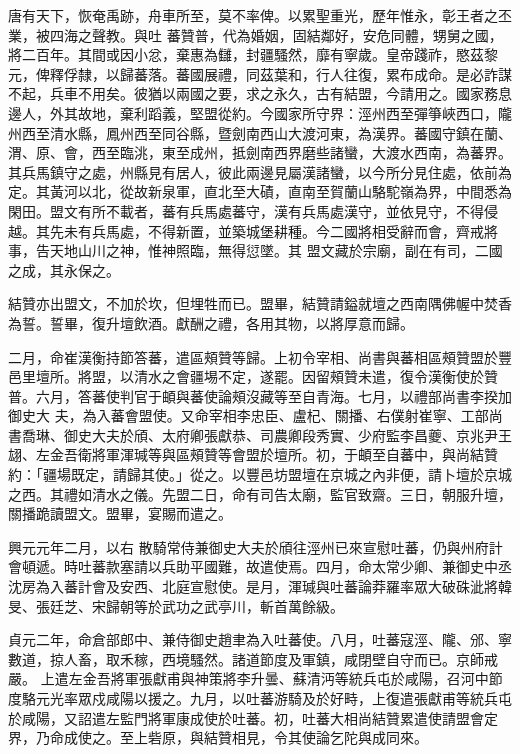 \begin{pinyinscope}
 唐有天下，恢奄禹跡，舟車所至，莫不率俾。以累聖重光，歷年惟永，彰王者之丕業，被四海之聲教。與吐
 蕃贊普，代為婚姻，固結鄰好，安危同體，甥舅之國，將二百年。其間或因小忿，棄惠為讎，封疆騷然，靡有寧歲。皇帝踐祚，愍茲黎元，俾釋俘隸，以歸蕃落。蕃國展禮，同茲葉和，行人往復，累布成命。是必詐謀不起，兵車不用矣。彼猶以兩國之要，求之永久，古有結盟，今請用之。國家務息邊人，外其故地，棄利蹈義，堅盟從約。今國家所守界：涇州西至彈箏峽西口，隴州西至清水縣，鳳州西至同谷縣，暨劍南西山大渡河東，為漢界。蕃國守鎮在蘭、
 渭、原、會，西至臨洮，東至成州，抵劍南西界磨些諸蠻，大渡水西南，為蕃界。其兵馬鎮守之處，州縣見有居人，彼此兩邊見屬漢諸蠻，以今所分見住處，依前為定。其黃河以北，從故新泉軍，直北至大磧，直南至賀蘭山駱駝嶺為界，中間悉為閑田。盟文有所不載者，蕃有兵馬處蕃守，漢有兵馬處漢守，並依見守，不得侵越。其先未有兵馬處，不得新置，並築城堡耕種。今二國將相受辭而會，齊戒將事，告天地山川之神，惟神照臨，無得愆墜。其
 盟文藏於宗廟，副在有司，二國之成，其永保之。



 結贊亦出盟文，不加於坎，但埋牲而已。盟畢，結贊請鎰就壇之西南隅佛幄中焚香為誓。誓畢，復升壇飲酒。獻酬之禮，各用其物，以將厚意而歸。



 二月，命崔漢衡持節答蕃，遣區頰贊等歸。上初令宰相、尚書與蕃相區頰贊盟於豐邑里壇所。將盟，以清水之會疆埸不定，遂罷。因留頰贊未遣，復令漢衡使於贊普。六月，答蕃使判官于頔與蕃使論頰沒藏等至自青海。七月，以禮部尚書李揆加御史大
 夫，為入蕃會盟使。又命宰相李忠臣、盧杞、關播、右僕射崔寧、工部尚書喬琳、御史大夫於頎、太府卿張獻恭、司農卿段秀實、少府監李昌夔、京兆尹王翃、左金吾衛將軍渾瑊等與區頰贊等會盟於壇所。初，于頔至自蕃中，與尚結贊約：「疆場既定，請歸其使。」從之。以豐邑坊盟壇在京城之內非便，請卜壇於京城之西。其禮如清水之儀。先盟二日，命有司告太廟，監官致齋。三日，朝服升壇，關播跪讀盟文。盟畢，宴賜而遣之。



 興元元年二月，以右
 散騎常侍兼御史大夫於頎往涇州已來宣慰吐蕃，仍與州府計會頓遞。時吐蕃款塞請以兵助平國難，故遣使焉。四月，命太常少卿、兼御史中丞沈房為入蕃計會及安西、北庭宣慰使。是月，渾瑊與吐蕃論莽羅率眾大破硃泚將韓旻、張廷芝、宋歸朝等於武功之武亭川，斬首萬餘級。



 貞元二年，命倉部郎中、兼侍御史趙聿為入吐蕃使。八月，吐蕃寇涇、隴、邠、寧數道，掠人畜，取禾稼，西境騷然。諸道節度及軍鎮，咸閉壁自守而已。京師戒嚴。
 上遣左金吾將軍張獻甫與神策將李升曇、蘇清沔等統兵屯於咸陽，召河中節度駱元光率眾戍咸陽以援之。九月，以吐蕃游騎及於好畤，上復遣張獻甫等統兵屯於咸陽，又詔遣左監門將軍康成使於吐蕃。初，吐蕃大相尚結贊累遣使請盟會定界，乃命成使之。至上砦原，與結贊相見，令其使論乞陀與成同來。




\end{pinyinscope}

